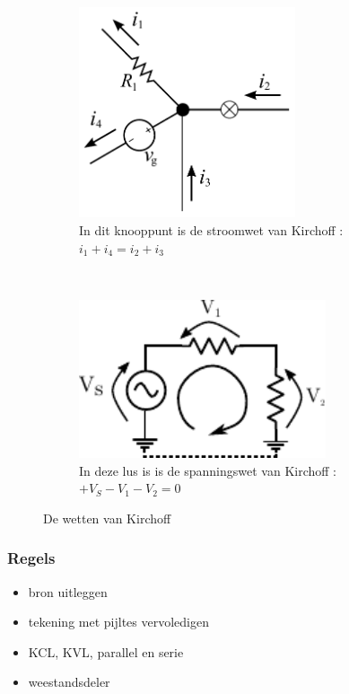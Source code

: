 \documentclass{article}
\begin{document}
\begin{figure}[htbp]
	\centering
	\begin{subfigure}[b]{0.45\linewidth}
		\centering
		\includegraphics[width=0.7\textwidth]{kcl.pdf}
		\caption{In dit knooppunt is de stroomwet van Kirchoff : $i_1 + i_4 = i_2+i_3$}
		\label{subfig:kcl}
	\end{subfigure}
	~
	\begin{subfigure}[b]{0.45\linewidth}
		\centering
		\includegraphics[width=0.8\textwidth]{kvl.pdf}
		\caption{In deze lus is is de spanningswet van Kirchoff : $ + V_S - V_1 - V_2 = 0$}
		\label{subfig:kvl}
	\end{subfigure}
\caption{De wetten van Kirchoff}
\label{fig:kirchoff}
\end{figure}

\subsubsection{Regels}
\begin{itemize}
	\item bron uitleggen
	\item tekening met pijltes vervoledigen
	\item KCL, KVL, parallel en serie
	\item weestandsdeler
\end{itemize}
\end{document}
